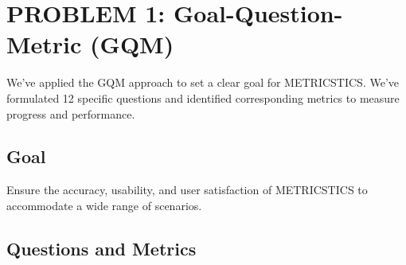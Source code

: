\documentclass[letterpaper,12pt]{article}
\begin{document}
\newpage
\section{PROBLEM 1: Goal-Question-Metric (GQM)}
We've applied the GQM approach to set a clear goal for METRICSTICS. We've formulated 12 specific questions and identified corresponding metrics to measure progress and performance.

\subsection{Goal}
Ensure the accuracy, usability, and user satisfaction of METRICSTICS to accommodate a wide range of scenarios.

\subsection{Questions and Metrics}
\end{document}
